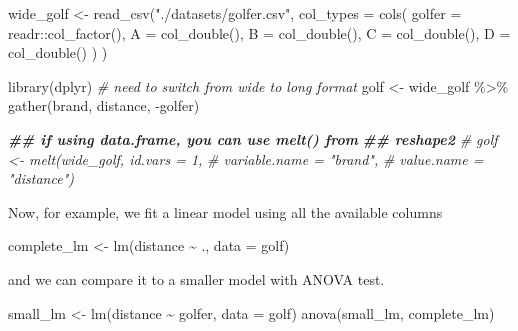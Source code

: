 \documentclass[
  oneside]{book}
\newenvironment{Shaded}{\begin{snugshade}}{\end{snugshade}}
\newcommand{\AttributeTok}[1]{\textcolor[rgb]{0.77,0.63,0.00}{#1}}
\newcommand{\CommentTok}[1]{\textcolor[rgb]{0.56,0.35,0.01}{\textit{#1}}}
\newcommand{\DocumentationTok}[1]{\textcolor[rgb]{0.56,0.35,0.01}{\textbf{\textit{#1}}}}
\newcommand{\FunctionTok}[1]{\textcolor[rgb]{0.00,0.00,0.00}{#1}}
\newcommand{\NormalTok}[1]{#1}
\newcommand{\OtherTok}[1]{\textcolor[rgb]{0.56,0.35,0.01}{#1}}
\newcommand{\SpecialCharTok}[1]{\textcolor[rgb]{0.00,0.00,0.00}{#1}}
\newcommand{\StringTok}[1]{\textcolor[rgb]{0.31,0.60,0.02}{#1}}
\begin{document}
\begin{Shaded}
\begin{Highlighting}[]
\NormalTok{wide\_golf }\OtherTok{\textless{}{-}} \FunctionTok{read\_csv}\NormalTok{(}\StringTok{"./datasets/golfer.csv"}\NormalTok{,}
  \AttributeTok{col\_types =} \FunctionTok{cols}\NormalTok{(}
    \AttributeTok{golfer =}\NormalTok{ readr}\SpecialCharTok{::}\FunctionTok{col\_factor}\NormalTok{(),}
    \AttributeTok{A =} \FunctionTok{col\_double}\NormalTok{(),}
    \AttributeTok{B =} \FunctionTok{col\_double}\NormalTok{(),}
    \AttributeTok{C =} \FunctionTok{col\_double}\NormalTok{(),}
    \AttributeTok{D =} \FunctionTok{col\_double}\NormalTok{()}
\NormalTok{  )}
\NormalTok{)}

\FunctionTok{library}\NormalTok{(dplyr)}
\CommentTok{\# need to switch from wide to long format}
\NormalTok{golf }\OtherTok{\textless{}{-}}\NormalTok{ wide\_golf }\SpecialCharTok{\%\textgreater{}\%}
  \FunctionTok{gather}\NormalTok{(brand, distance, }\SpecialCharTok{{-}}\NormalTok{golfer)}

\DocumentationTok{\#\# if using data.frame, you can use \textasciigrave{}melt()\textasciigrave{} from}
\DocumentationTok{\#\# reshape2}
\CommentTok{\# golf \textless{}{-} melt(wide\_golf, id.vars = 1,}
\CommentTok{\#             variable.name = "brand",}
\CommentTok{\#             value.name = "distance")}
\end{Highlighting}
\end{Shaded}

Now, for example, we fit a linear model using all the
available columns

\begin{Shaded}
\begin{Highlighting}[]
\NormalTok{complete\_lm }\OtherTok{\textless{}{-}} \FunctionTok{lm}\NormalTok{(distance }\SpecialCharTok{\textasciitilde{}}\NormalTok{ ., }\AttributeTok{data =}\NormalTok{ golf)}
\end{Highlighting}
\end{Shaded}

and we can compare it to a smaller model with ANOVA test.

\begin{Shaded}
\begin{Highlighting}[]
\NormalTok{small\_lm }\OtherTok{\textless{}{-}} \FunctionTok{lm}\NormalTok{(distance }\SpecialCharTok{\textasciitilde{}}\NormalTok{ golfer, }\AttributeTok{data =}\NormalTok{ golf)}
\FunctionTok{anova}\NormalTok{(small\_lm, complete\_lm)}
\end{Highlighting}
\end{Shaded}
\end{document}

